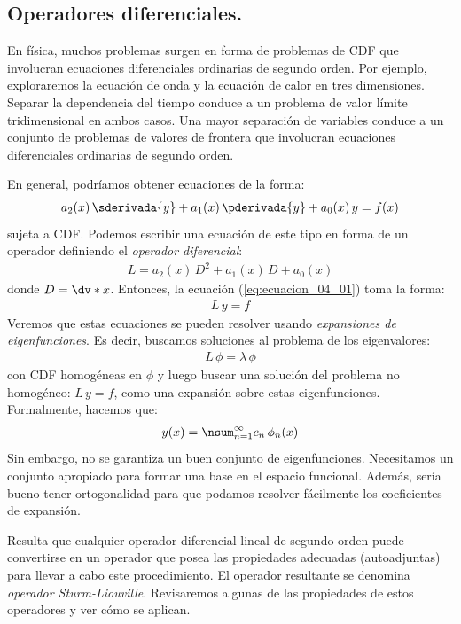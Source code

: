\subsection{Operadores diferenciales.}

En física, muchos problemas surgen en forma de problemas de CDF que involucran ecuaciones diferenciales ordinarias de segundo orden. Por ejemplo, exploraremos la ecuación de onda y la ecuación de calor en tres dimensiones. Separar la dependencia del tiempo conduce a un problema de valor límite tridimensional en ambos casos. Una mayor separación de variables conduce a un conjunto de problemas de valores de frontera que involucran ecuaciones diferenciales ordinarias de segundo orden.
\par
En general, podríamos obtener ecuaciones de la forma:
\begin{align}
a_{2} (x) \, \sderivada{y} + a_{1} (x) \, \pderivada{y} + a_{0} (x) \, y = f(x)
\label{eq:ecuacion_04_01}
\end{align}
sujeta a CDF. Podemos escribir una ecuación de este tipo en forma de un operador definiendo el \emph{operador diferencial}:
\begin{align*}
L = a_{2} (x) \, D^{2} + a_{1} (x) \, D + a_{0} (x)
\end{align*}
donde $D = \dv*{x}$. Entonces, la ecuación (\ref{eq:ecuacion_04_01}) toma la forma:
\begin{align*}
L \, y = f
\end{align*}
Veremos que estas ecuaciones se pueden resolver usando \emph{expansiones de eigenfunciones}. Es decir, buscamos soluciones al problema de los eigenvalores:
\begin{align*}
L \, \phi = \lambda \, \phi
\end{align*}
con CDF homogéneas en $\phi$ y luego buscar una solución del problema no homogéneo: $L \, y = f$, como una expansión sobre estas eigenfunciones. Formalmente, hacemos que:
\begin{align*}
y (x) = \nsum_{n=1}^{\infty} c_{n} \, \phi_{n} (x)
\end{align*}
Sin embargo, no se garantiza un buen conjunto de eigenfunciones. Necesitamos un conjunto apropiado para formar una base en el espacio funcional. Además, sería bueno tener ortogonalidad para que podamos resolver fácilmente los coeficientes de expansión.
\par
Resulta que cualquier operador diferencial lineal de segundo orden puede convertirse en un operador que posea las propiedades adecuadas (autoadjuntas) para llevar a cabo este procedimiento. El operador resultante se denomina \emph{operador Sturm-Liouville}. Revisaremos algunas de las propiedades de estos operadores y ver cómo se aplican.

